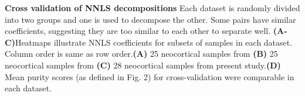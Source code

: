 \textbf{Cross validation of NNLS decompositions}
 Each dataset is randomly divided into two groups and one is used to decompose the other. Some pairs have similar coefficients, suggesting they are too similar to each other to separate well. \textbf{(A-C)}Heatmaps illustrate NNLS coefficients for subsets of samples in each dataset. Column order is same as row order.\textbf{(A)} 25 neocortical samples from \cite{Tasic_2018} \textbf{(B)} 25 neocortical samples from \cite{Zeisel_2018}\textbf{(C)} 28 neocortical samples from present study.\textbf{(D)} Mean purity scores (as defined in Fig. 2) for cross-validation were comparable in each dataset.
 
